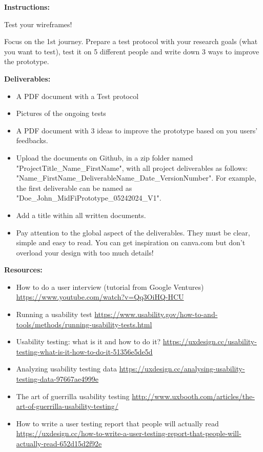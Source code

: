 \makeheaderfiles

\textbf{Instructions:}

Test your wireframes!

Focus on the 1st journey. Prepare a test protocol with your research goals (what you want to test), test it on 5 different people and write down 3 ways to improve the prototype.

\textbf{Deliverables:}

\begin{itemize}
\item A PDF document with a Test protocol
\item Pictures of the ongoing tests
\item A PDF document with 3 ideas to improve the prototype based on you users' feedbacks.
\item Upload the documents on Github, in a zip folder named "ProjectTitle\_Name\_FirstName", with all project deliverables as follows: "Name\_FirstName\_DeliverableName\_Date\_VersionNumber".  For example, the first deliverable can be named as "Doe\_John\_MidFiPrototype\_05242024\_V1".
\item Add a title within all written documents.
\item Pay attention to the global aspect of the deliverables. They must be clear, simple and easy to read. You can get inspiration on canva.com but don't overload your design with too much details!
\end{itemize}

\textbf{Resources:}

\begin{itemize}
\item How to do a user interview (tutorial from Google Ventures) \url{https://www.youtube.com/watch?v=Qq3OiHQ-HCU}
\item Running a usability test \url{https://www.usability.gov/how-to-and-tools/methods/running-usability-tests.html}
\item Usability testing: what is it and how to do it? \url{https://uxdesign.cc/usability-testing-what-is-it-how-to-do-it-51356e5de5d}
\item Analyzing usability testing data \url{https://uxdesign.cc/analysing-usability-testing-data-97667ae4999e}
\item The art of guerrilla usability testing \url{http://www.uxbooth.com/articles/the-art-of-guerrilla-usability-testing/}
\item How to write a user testing report that people will actually read \url{https://uxdesign.cc/how-to-write-a-user-testing-report-that-people-will-actually-read-652d15d2f92e}
\end{itemize}

